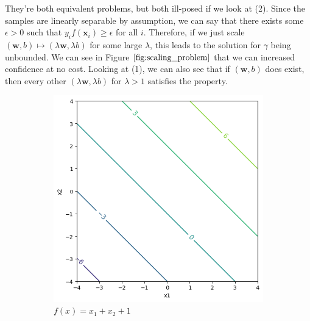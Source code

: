 \documentclass{article}
\theoremstyle{definition}
\begin{document}
  They're both equivalent problems, but both ill-posed if we look at (2). Since the samples are linearly separable by assumption, we can say that there exists some $\epsilon > 0$ such that $y_i f(\mathbf{x}_i) \geq \epsilon$ for all $i$. Therefore, if we just scale $(\mathbf{w}, b) \mapsto (\lambda \mathbf{w}, \lambda b)$ for some large $\lambda$, this leads to the solution for $\gamma$ being unbounded. We can see in Figure $\ref{fig:scaling_problem}$ that we can increased confidence at no cost. Looking at (1), we can also see that if $(\mathbf{w}, b)$ does exist, then every other $(\lambda \mathbf{w}, \lambda b)$ for $\lambda > 1$ satisfies the property.   

  \begin{figure}[hbt!] 
      \centering 
      \begin{subfigure}[b]{0.32\textwidth} 
          \centering 
          \includegraphics[width=\textwidth]{scaling1.png} 
          \caption{$f(x) = x_1 + x_2 + 1$} 
          \label{fig:original_scaled}
      \end{subfigure} 
      \hfill    
      \begin{subfigure}[b]{0.32\textwidth} 
          \centering 

\end{subfigure}
\end{figure}
\end{document}
